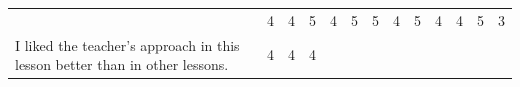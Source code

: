 \documentclass[paper=a4,justified,a4paper]{tufte-handout}
\begin{document}
\begin{longtable}[]{@{}lllllllllllll@{}}
\begin{minipage}[t]{0.07\columnwidth}
\end{minipage} & \begin{minipage}[t]{0.04\columnwidth}\raggedright
4\strut
\end{minipage} & \begin{minipage}[t]{0.04\columnwidth}\raggedright
4\strut
\end{minipage} & \begin{minipage}[t]{0.04\columnwidth}\raggedright
5\strut
\end{minipage} & \begin{minipage}[t]{0.04\columnwidth}\raggedright
4\strut
\end{minipage} & \begin{minipage}[t]{0.04\columnwidth}\raggedright
5\strut
\end{minipage} & \begin{minipage}[t]{0.04\columnwidth}\raggedright
5\strut
\end{minipage} & \begin{minipage}[t]{0.04\columnwidth}\raggedright
4\strut
\end{minipage} & \begin{minipage}[t]{0.04\columnwidth}\raggedright
5\strut
\end{minipage} & \begin{minipage}[t]{0.07\columnwidth}\raggedright
4\strut
\end{minipage} & \begin{minipage}[t]{0.07\columnwidth}\raggedright
4\strut
\end{minipage} & \begin{minipage}[t]{0.07\columnwidth}\raggedright
5\strut
\end{minipage} & \begin{minipage}[t]{0.07\columnwidth}\raggedright
3\strut
\end{minipage}\tabularnewline
\begin{minipage}[t]{0.07\columnwidth}\raggedright
\scriptsize I liked the teacher's approach in this lesson better than in
other lessons.\strut
\end{minipage} & \begin{minipage}[t]{0.04\columnwidth}\raggedright
4\strut
\end{minipage} & \begin{minipage}[t]{0.04\columnwidth}\raggedright
4\strut
\end{minipage} & \begin{minipage}[t]{0.04\columnwidth}\raggedright
4\strut
\end{minipage} & \begin{minipage}[t]{0.04\columnwidth}\raggedright

\end{minipage}
\end{longtable}
\end{document}
